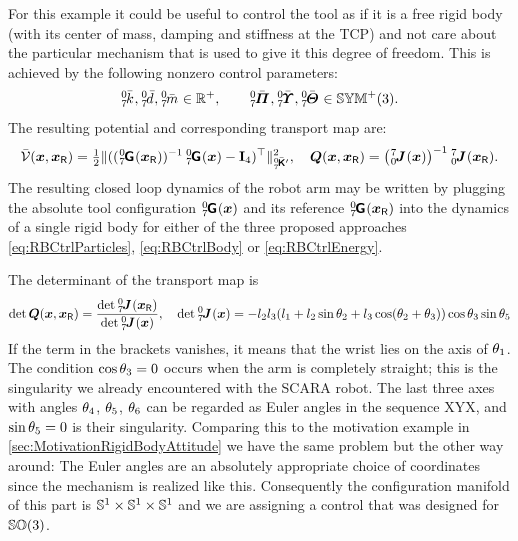 For this example it could be useful to control the tool as if it is a free rigid body (with its center of mass, damping and stiffness at the TCP) and not care about the particular mechanism that is used to give it this degree of freedom.
This is achieved by the following nonzero control parameters:
\begin{align}
 \bodyStiffnessC{0}{7}, \bodyDampingC{0}{7}, \bodyMassC{0}{7} \in \RealNumP,
\qquad
 \bodyMOSC{0}{7}, \bodyMODC{0}{7}, \bodyMOIC{0}{7} \in \SymMatP(3).
\end{align}
The resulting potential and corresponding transport map are:
\begin{align}
 \potentialEnergyC(\sysCoord, \sysCoordR) = \tfrac{1}{2} \norm[\bodyStiffMatCp{0}{7}]{ ((\bodyHomoCoord{0}{7}(\sysCoordR))^{-1}\, \bodyHomoCoord{0}{7}(\sysCoord) - \idMat[4] )^\top}^2,
\quad
 \sysTransportMap(\sysCoord,\sysCoordR) = \big( \bodyJac{7}{0}(\sysCoord) \big)^{-1} \, \bodyJac{7}{0}(\sysCoordR).
\end{align}
The resulting closed loop dynamics of the robot arm may be written by plugging the absolute tool configuration $\bodyHomoCoord{0}{7}(\sysCoord)$ and its reference $\bodyHomoCoord{0}{7}(\sysCoordR)$ into the dynamics of a single rigid body for either of the three proposed approaches \eqref{eq:RBCtrlParticles}, \eqref{eq:RBCtrlBody} or \eqref{eq:RBCtrlEnergy}.

The determinant of the transport map is
\begin{align}
 \det \sysTransportMap(\sysCoord,\sysCoordR) = \frac{\det \bodyJac{0}{7}(\sysCoordR)}{\det \bodyJac{0}{7}(\sysCoord)},
\quad
 \det \bodyJac{0}{7}(\sysCoord) = -l_2 l_3 (l_1 + l_2 \sin\jointAngle[2] + l_3 \cos(\jointAngle[2]+\jointAngle[3])) \cos\jointAngle[3] \sin\jointAngle[5]
\end{align}
If the term in the brackets vanishes, it means that the wrist lies on the axis of $\jointAngle[1]$.
The condition $\cos\jointAngle[3] = 0$ occurs when the arm is completely straight; this is the singularity we already encountered with the SCARA robot.
The last three axes with angles $\jointAngle[4]$, $\jointAngle[5]$, $\jointAngle[6]$ can be regarded as Euler angles in the sequence XYX, and $\sin\jointAngle[5] = 0$ is their singularity.
Comparing this to the motivation example in \autoref{sec:MotivationRigidBodyAttitude} we have the same problem but the other way around:
The Euler angles are an absolutely appropriate choice of coordinates since the mechanism is realized like this.
Consequently the configuration manifold of this part is $\Sphere^1 \times \Sphere^1 \times \Sphere^1$ and we are assigning a control that was designed for $\SpecialOrthogonalGroup(3)$.

